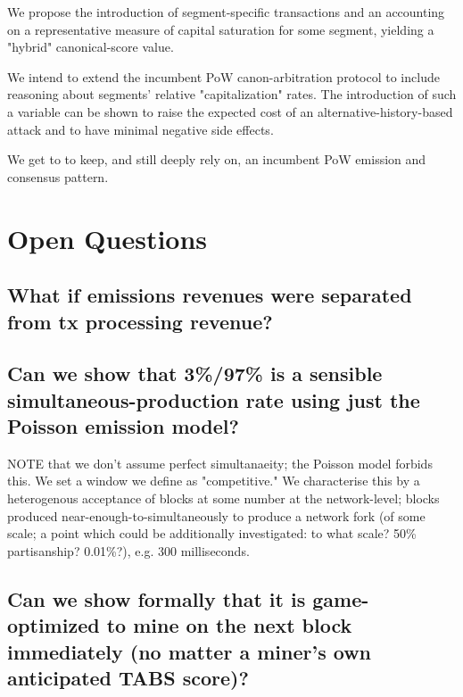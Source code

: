 \documentclass[11pt]{article}
\theoremstyle{plain}
\begin{document}
We propose the introduction of segment-specific transactions and an accounting
on a representative measure of capital saturation for some segment, yielding a
"hybrid" canonical-score value.

We intend to extend the incumbent PoW canon-arbitration protocol to include
reasoning about segments' relative "capitalization" rates.
The introduction of such a variable can be shown to raise the expected cost of
an alternative-history-based attack and to have minimal negative side effects.

We get to to keep, and still deeply rely on, an incumbent PoW emission and
consensus pattern.





\section{\normalsize{Open Questions}}

\subsection{\small{What if emissions revenues were separated from tx processing
revenue?}}


\subsection{\small{Can we show that 3\%/97\% is a sensible
simultaneous-production rate using just the Poisson emission
model?}}

NOTE that we don't assume perfect simultanaeity; the Poisson model forbids this.
We set a window we define as "competitive." We characterise this by a
heterogenous acceptance of blocks at some number at the network-level; blocks
produced near-enough-to-simultaneously to produce a network fork (of some
scale; a point which could be additionally investigated: to what scale? 50\%
partisanship? 0.01\%?), e.g. 300 milliseconds.

\subsection{\small{Can we show formally that it is game-optimized to mine on
the next block immediately (no matter a miner's own anticipated TABS
score)?}}
\end{document}
